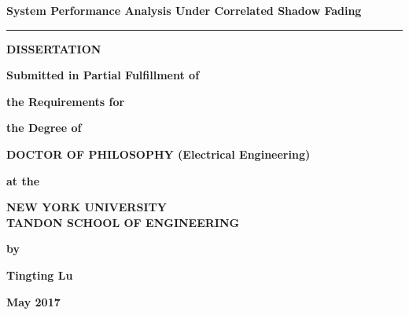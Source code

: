  \baselineskip \thispagestyle{empty}

\begin{center}
{\large \bf System Performance Analysis Under Correlated Shadow Fading} %
 \vspace{0.3in}

 \rule{2.5in}{0.01in}
 
 \vspace{0.3in}
 
{\large \bf DISSERTATION}

\vspace{0.4in}

{\large \bf Submitted in Partial Fulfillment of}
\vspace{0.1in}

{\large \bf the Requirements for}
\vspace{0.1in}

{\large \bf the Degree of} \vspace{0.4in}

{\large \bf DOCTOR OF PHILOSOPHY (Electrical Engineering)}

\vspace{0.4in}
{\large \bf at the}
\vspace{0.15in}

{\large \bf NEW YORK UNIVERSITY\\
TANDON SCHOOL OF ENGINEERING} 
\vspace{0.2in}

{\large \bf by}
\vspace{0.4in}

{\large \bf Tingting Lu} 
\vspace{0.4in}

{\large \bf May 2017}
\end{center}

